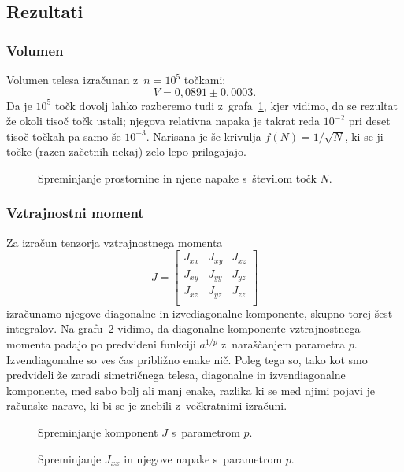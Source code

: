 \documentclass[a4paper,pdftex,10pt]{article}
\numberwithin{figure}{section} %
\begin{document}
\subsection{Rezultati}
\subsubsection{Volumen}
Volumen telesa izračunan z~$n=10^5$ točkami:
$$V = 0,0891 \pm 0,0003.$$
Da je $10^5$ točk dovolj lahko razberemo tudi z~grafa~\ref{slika3}, kjer vidimo, da se 
rezultat že okoli tisoč točk ustali; njegova relativna napaka je takrat reda $10^{-2}$
pri deset tisoč točkah pa samo še $10^{-3}$. Narisana je še krivulja $f(N) = 1/\sqrt{N}$,
ki se ji točke (razen začetnih nekaj) zelo lepo prilagajajo.\\
\begin{figure}    
    \centering
    \resizebox{.49\linewidth}{!}{}
    \resizebox{.49\linewidth}{!}{}
    \caption{Spreminjanje prostornine in njene napake s~številom točk $N$.}
    \label{slika3}
\end{figure}

\subsubsection{Vztrajnostni moment}
Za izračun tenzorja vztrajnostnega momenta
\begin{equation}
    J = 
    \begin{bmatrix}
	J_{xx} & J_{xy} & J_{xz} \\
	J_{xy} & J_{yy} & J_{yz} \\
	J_{xz} & J_{yz} & J_{zz} \\
    \end{bmatrix}
\end{equation}
izračunamo njegove diagonalne in izvediagonalne komponente, skupno torej šest integralov.
Na grafu~\ref{slika1} vidimo, da diagonalne komponente vztrajnostnega momenta padajo po
predvideni funkciji $a^{1/p}$ z~naraščanjem parametra $p$. Izvendiagonalne so ves čas 
približno enake nič. Poleg tega so, tako kot smo predvideli že zaradi simetričnega
telesa, diagonalne in izvendiagonalne komponente, med sabo bolj ali manj enake, razlika ki 
se med njimi pojavi je računske narave, ki bi se je znebili z~večkratnimi izračuni.

\begin{figure}    
    \centering
    \resizebox{.7\linewidth}{!}{}
    \caption{Spreminjanje komponent $J$ s~parametrom $p$.}
    \label{slika1}
\end{figure}
\begin{figure}    
    \centering
    \resizebox{0.49\linewidth}{!}{}
    \resizebox{0.49\linewidth}{!}{}
    \caption{Spreminjanje $J_{xx}$ in njegove napake s~parametrom $p$.}
    \label{slika2}
\end{figure}
\end{document}
